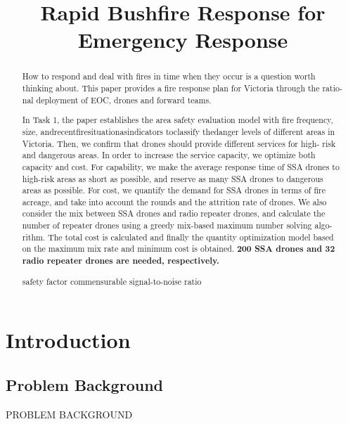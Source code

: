 \documentclass{mcmthesis}
\title{\textbf{Rapid Bushfire Response for Emergency Response}}
\begin{document}
\begin{abstract}
	\qquad How to respond and deal with fires in time when they occur is a question worth
	thinking about. This paper provides a fire response plan for Victoria through the ratio-
	nal deployment of EOC, drones and forward teams.

	In Task 1, the paper establishes the area safety evaluation model with fire frequency,
	size, andrecentfiresituationasindicators toclassify thedanger levels of different areas
	in Victoria. Then, we confirm that drones should provide different services for high-
	risk and dangerous areas. In order to increase the service capacity, we optimize both
	capacity and cost. For capability, we make the average response time of SSA drones
	to high-risk areas as short as possible, and reserve as many SSA drones to dangerous
	areas as possible. For cost, we quantify the demand for SSA drones in terms of fire
	acreage, and take into account the rounds and the attrition rate of drones. We also
	consider the mix between SSA drones and radio repeater drones, and calculate the
	number of repeater drones using a greedy mix-based maximum number solving algo-
	rithm. The total cost is calculated and finally the quantity optimization model based on
	the maximum mix rate and minimum cost is obtained.\textbf{ 200 SSA drones and 32 radio
		repeater drones are needed, respectively.}
	\begin{keywords}
		safety factor \quad commensurable \quad signal-to-noise ratio
	\end{keywords}
\end{abstract}

\maketitle



\clearpage
\pagestyle{fancy}
\newpage
\setcounter{page}{1}

\newpage   %
\tableofcontents
\thispagestyle{empty}
\newpage

\section{Introduction}
\subsection{Problem Background}
PROBLEM BACKGROUND
\end{document}
